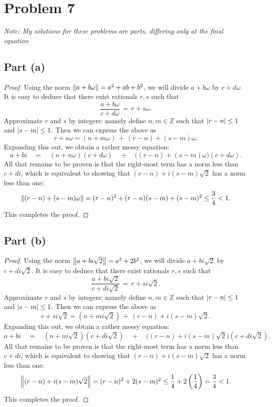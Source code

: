 \documentclass[11pt]{article}
\begin{document}
\section{Problem 7}

\textit{Note: My solutions for these problems are parts, differing only at the final equation}


\subsection*{Part (a)}

\begin{proof}
  

Using the norm $\norm{a + b \omega} = a^{2} + ab + b^{2}$, we will divide $a + b \omega$ by $c + d \omega$. It is easy to deduce that there exist rationals $r, s$ such that
  \[
    \frac{a + b \omega}{c + d \omega} \, = \, r + s \omega.
  \]
  Approximate $r$ and $s$ by integers: namely define $n, m 
  \in \mathbb{Z}$ such that $\abs{r - n} \le 1$ and $\abs{s - m} \le 1$. Then we can express the above as
  \[
    r + s \omega = (n + m \omega) \, + \, (r - n) + (s - m) \omega.
  \]
  Expanding this out, we obtain a rather messy equation:
  \[
    a + bi \quad = \quad (n + n \omega)(c + d \omega) \quad + \quad \big( (r - n) + (s - m) \omega \big)(c + d \omega).
  \]
  All that remains to be proven is that the right-most term has a norm less than $c + di$, which is equivalent to showing that $(r - n) + i (s - m) \sqrt{2}$ has a norm less than one:
  \[
    \norm{(r - n) + (s - m) \omega} = (r - n)^{2} + (r - n)(s - m) + (s - m)^{2} \le \frac{3}{4} < 1.
  \]
  This completes the proof.
\end{proof}


\subsection*{Part (b)}

\begin{proof}
  Using the norm $\norm{a + bi \sqrt{2}} = a^{2} + 2b^{2}$, we will divide $a + bi \sqrt{2}$ by $c + di \sqrt{2}$. It is easy to deduce that there exist rationals $r, s$ such that
  \[
    \frac{a + bi \sqrt{2}}{c + di \sqrt{2}} \, = \, r + s i \sqrt{2}.
  \]
  Approximate $r$ and $s$ by integers: namely define $n, m 
  \in \mathbb{Z}$ such that $\abs{r - n} \le 1$ and $\abs{s - m} \le 1$. Then we can express the above as
  \[
    r + si \sqrt{2} = (n + mi \sqrt{2}) \, + \, (r - n) + i(s - m) \sqrt{2}.
  \]
  Expanding this out, we obtain a rather messy equation:
  \[
    a + bi \quad = \quad (n + ni \sqrt{2})(c + di \sqrt{2}) \quad + \quad \big( (r - n) + i(s - m) \sqrt{2} \big)(c + di \sqrt{2}).
  \]
  All that remains to be proven is that the right-most term has a norm less than $c + di$, which is equivalent to showing that $(r - n) + i (s - m) \sqrt{2}$ has a norm less than one:
  \[
    \norm{(r - n) + i(s - m) \sqrt{2}} = (r - n)^{2} + 2(s - m)^{2} \le \frac{1}{4} + 2 \left( \frac{1}{4} \right) = \frac{3}{4} < 1.
  \]
  This completes the proof.
\end{proof}
\end{document}
